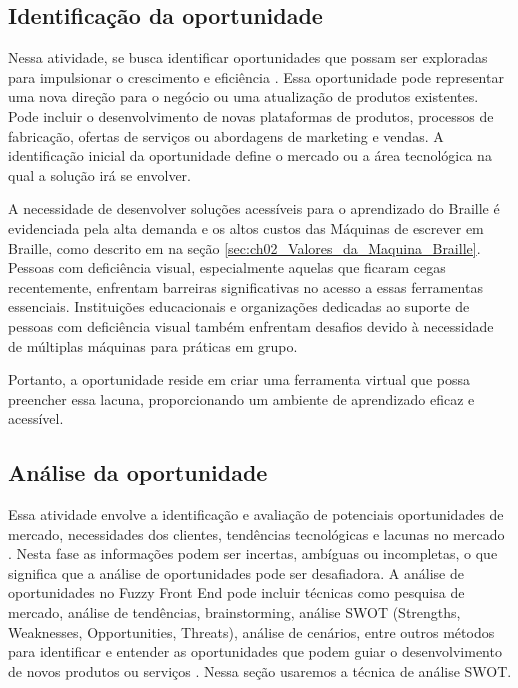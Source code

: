 \subsection{Identificação da oportunidade}

Nessa atividade, se busca identificar oportunidades que possam ser exploradas para impulsionar o crescimento e eficiência \parencite{BOOK01}. Essa oportunidade pode representar uma nova direção para o negócio ou uma atualização de produtos existentes. Pode incluir o desenvolvimento de novas plataformas de produtos, processos de fabricação, ofertas de serviços ou abordagens de marketing e vendas. A identificação inicial da oportunidade define o mercado ou a área tecnológica na qual a solução irá se envolver.

A necessidade de desenvolver soluções acessíveis para o aprendizado do Braille é evidenciada pela alta demanda e os altos custos das Máquinas de escrever em Braille, como descrito em na seção \ref{sec:ch02_Valores_da_Maquina_Braille}. Pessoas com deficiência visual, especialmente aquelas que ficaram cegas recentemente, enfrentam barreiras significativas no acesso a essas ferramentas essenciais. Instituições educacionais e organizações dedicadas ao suporte de pessoas com deficiência visual também enfrentam desafios devido à necessidade de múltiplas máquinas para práticas em grupo. 

Portanto, a oportunidade reside em criar uma ferramenta virtual que possa preencher essa lacuna, proporcionando um ambiente de aprendizado eficaz e acessível.

\subsection{Análise da oportunidade}

Essa atividade envolve a identificação e avaliação de potenciais oportunidades de mercado, necessidades dos clientes, tendências tecnológicas e lacunas no mercado \parencite{BOOK01}. Nesta fase as informações podem ser incertas, ambíguas ou incompletas, o que significa que a análise de oportunidades pode ser desafiadora. A análise de oportunidades no Fuzzy Front End pode incluir técnicas como pesquisa de mercado, análise de tendências, brainstorming, análise SWOT (Strengths, Weaknesses, Opportunities, Threats), análise de cenários, entre outros métodos para identificar e entender as oportunidades que podem guiar o desenvolvimento de novos produtos ou serviços \parencite{BOOK01}. Nessa seção usaremos a técnica de análise SWOT.

